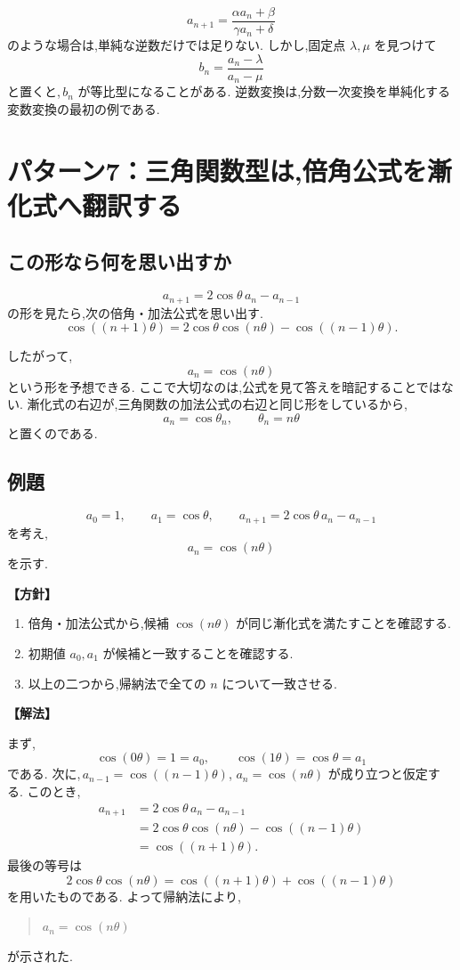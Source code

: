 \[
  a_{n+1}=\frac{\alpha a_n+\beta}{\gamma a_n+\delta}
\]
のような場合は,単純な逆数だけでは足りない.
しかし,固定点 $\lambda,\mu$ を見つけて
\[
  b_n=\frac{a_n-\lambda}{a_n-\mu}
\]
と置くと,\,$b_n$ が等比型になることがある.
逆数変換は,分数一次変換を単純化する変数変換の最初の例である.

\section{パターン7：三角関数型は,倍角公式を漸化式へ翻訳する}

\subsection{この形なら何を思い出すか}

\[
  a_{n+1}=2\cos\theta\,a_n-a_{n-1}
\]
の形を見たら,次の倍角・加法公式を思い出す.
\[
  \cos((n+1)\theta)
  =2\cos\theta\cos(n\theta)-\cos((n-1)\theta).
\]

したがって,
\[
  a_n=\cos(n\theta)
\]
という形を予想できる.
ここで大切なのは,公式を見て答えを暗記することではない.
漸化式の右辺が,三角関数の加法公式の右辺と同じ形をしているから,
\[
  a_n=\cos\theta_n,\qquad \theta_n=n\theta
\]
と置くのである.

\subsection{例題}

\[
  a_0=1,\qquad a_1=\cos\theta,\qquad
  a_{n+1}=2\cos\theta\,a_n-a_{n-1}
\]
を考え,
\[
  a_n=\cos(n\theta)
\]
を示す.

\noindent\textbf{【方針】}

\begin{enumerate}
  \item 倍角・加法公式から,候補 $\cos(n\theta)$ が同じ漸化式を満たすことを確認する.
  \item 初期値 $a_0,a_1$ が候補と一致することを確認する.
  \item 以上の二つから,帰納法で全ての $n$ について一致させる.
\end{enumerate}

\noindent\textbf{【解法】}

まず,
\[
  \cos(0\theta)=1=a_0,\qquad
  \cos(1\theta)=\cos\theta=a_1
\]
である.
次に,\,$a_{n-1}=\cos((n-1)\theta)$,
$a_n=\cos(n\theta)$ が成り立つと仮定する.
このとき,
\[
\begin{aligned}
  a_{n+1}
  &=2\cos\theta\,a_n-a_{n-1}\\
  &=2\cos\theta\cos(n\theta)
    -\cos((n-1)\theta)\\
  &=\cos((n+1)\theta).
\end{aligned}
\]
最後の等号は
\[
  2\cos\theta\cos(n\theta)
  =\cos((n+1)\theta)+\cos((n-1)\theta)
\]
を用いたものである.
よって帰納法により,
\begin{quote}
  $a_n=\cos(n\theta)$
\end{quote}
が示された.

